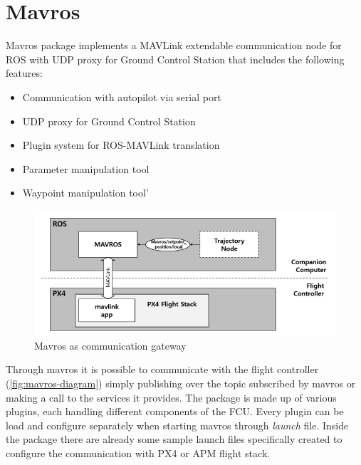 
\chapter{Mavros} %
\label{appendix:mavros}
Mavros package implements a MAVLink extendable communication node for ROS with UDP proxy for Ground Control Station that includes the following features:
\begin{itemize}
	\item Communication with autopilot via serial port
	\item UDP proxy for Ground Control Station
	\item Plugin system for ROS-MAVLink translation
	\item Parameter manipulation tool
	\item Waypoint manipulation tool'
\end{itemize}

 \begin{figure}[ht]
    \centering
    \includegraphics[width=.7\textwidth]{figures/A4/diagram.png}
    \caption{Mavros as communication gateway}
    \label{fig:mavros-diagram}
\end{figure}
Through mavros it is possible to communicate with the flight controller (\autoref{fig:mavros-diagram}) simply publishing over the topic subscribed by mavros or making a call to the services it provides.
The package is made up of various plugins, each handling different components of the FCU.
Every plugin can be load and configure separately when starting mavros through \textit{launch} file. Inside the package there are already some sample launch files specifically created to configure the communication with PX4 or APM flight stack.

